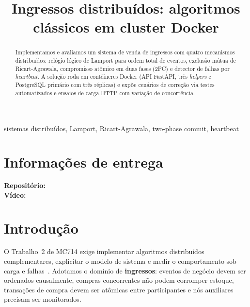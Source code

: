\documentclass[conference]{IEEEtran}
\begin{document}
\title{Ingressos distribu\'idos: algoritmos cl\'assicos em cluster Docker}

\author{
\and
{}
}

\maketitle

\begin{abstract}
Implementamos e avaliamos um sistema de venda de ingressos com quatro
mecanismos distribuídos: relógio lógico de Lamport para ordem total de
eventos, exclusão mútua de Ricart-Agrawala, compromisso atômico em duas
fases (2PC) e detector de falhas por \emph{heartbeat}. A solução roda em
contêineres Docker (API FastAPI, três \emph{helpers} e PostgreSQL
primário com três réplicas) e expõe cenários de correção via testes
automatizados e ensaios de carga HTTP com variação de concorrência.
\end{abstract}

\begin{IEEEkeywords}
sistemas distribuídos, Lamport, Ricart-Agrawala, two-phase commit, heartbeat
\end{IEEEkeywords}

\section*{Informações de entrega}
\textbf{Repositório:} \\
\textbf{Vídeo:} 

\section{Introdução}

O Trabalho~2 de MC714 exige implementar algoritmos distribuídos
complementares, explicitar o modelo de sistema e medir o comportamento
sob carga e falhas~\cite{vanSteen2023}. Adotamos o domínio de
\textbf{ingressos}: eventos de negócio devem ser ordenados
causalmente, compras concorrentes não podem corromper estoque, transações
de compra devem ser atômicas entre participantes e nós auxiliares precisam
ser monitorados.
\end{document}
